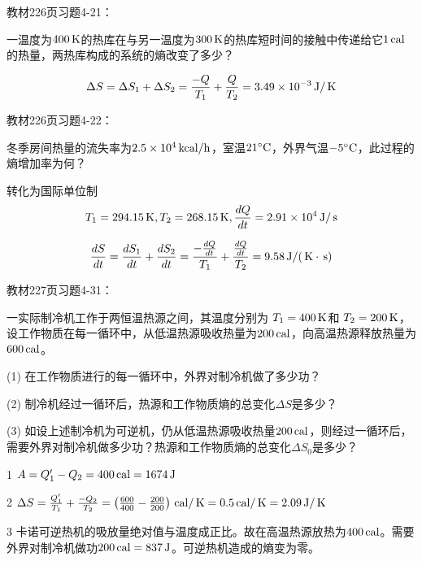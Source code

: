\documentclass[CJK]{beamer}
\begin{document}
\begin{frame}
  \chtitle{\proid (\sone)}
  \bch
  教材226页习题4-21：

  一温度为$400\,\mathrm{K}$的热库在与另一温度为$300\,\mathrm{K}$的热库短时间的接触中传递给它$1\,\mathrm{cal}$的热量，两热库构成的系统的熵改变了多少？
  \ech
\end{frame}


\begin{frame}
  \bch
  $$\Delta S =\Delta S_1 + \Delta S_2 =  \frac{-Q}{T_1} +\frac{Q}{T_2} = 3.49\times 10^{-3} \,\mathrm{J}/\,\mathrm{K}$$
  \ech
\end{frame}

\begin{frame}
  \chtitle{\proid (\sone)}
  \bch
  教材226页习题4-22：

  冬季房间热量的流失率为$2.5\times 10^4\,\mathrm{kcal}/\mathrm{h}$，室温$21^\circ \mathrm{C}$，外界气温$-5^\circ \mathrm{C}$，此过程的熵增加率为何？
  \ech
\end{frame}

\begin{frame}
  \bch
  转化为国际单位制
  $$T_1 = 294.15\,\mathrm{K}, T_2 = 268.15\,\mathrm{K}, \frac{dQ}{dt} = 2.91\times 10^4 \,\mathrm{J}/\,\mathrm{s}$$
  
  $$\frac{d S}{dt} = \frac{d S_1}{dt} + \frac{d S_2}{dt} = \frac{-\frac{dQ}{dt}}{T_1} +\frac{\frac{dQ}{dt}}{T_2} = 9.58 \,\mathrm{J}/(\,\mathrm{K}\cdot\,\mathrm{s})$$
  \ech
\end{frame}

\begin{frame}
  \chtitle{\proid (\stwo)}
  \bch
  教材227页习题4-31：

  一实际制冷机工作于两恒温热源之间，其温度分别为 $T_1= 400\,\mathrm{K}$和 $T_2 = 200\,\mathrm{K}$，设工作物质在每一循环中，从低温热源吸收热量为$200\,\mathrm{cal}$，向高温热源释放热量为$600\,\mathrm{cal}$。
  \bitem
\item[(1)]{在工作物质进行的每一循环中，外界对制冷机做了多少功？}
\item[(2)]{制冷机经过一循环后，热源和工作物质熵的总变化$\Delta S$是多少？}
\item[(3)]{如设上述制冷机为可逆机，仍从低温热源吸收热量$200\,\mathrm{cal}$，则经过一循环后，需要外界对制冷机做多少功？热源和工作物质熵的总变化$\Delta S_0$是多少？}
  \eitem
  
  \ech
\end{frame}


\begin{frame}
  \bch
  {\small
    \bitem
  \item[1]{$A = Q_1'-Q_2  = 400\,\mathrm{cal} = 1674\,\mathrm{J}$}
  \item[2]{$\Delta S = \frac{Q_1'}{T_1}+\frac{-Q_2}{T_2} = \left(\frac{600}{400}-\frac{200}{200}\right)\,\mathrm{cal}/\,\mathrm{K} = 0.5\,\mathrm{cal}/\,\mathrm{K} = 2.09\,\mathrm{J}/\,\mathrm{K}$}
  \item[3]{卡诺可逆热机的吸放量绝对值与温度成正比。故在高温热源放热为$400\,\mathrm{cal}$。需要外界对制冷机做功$200\,\mathrm{cal} = 837\,\mathrm{J}$。可逆热机造成的熵变为零。}
  \eitem
  }
  \ech
\end{frame}
\end{document}

